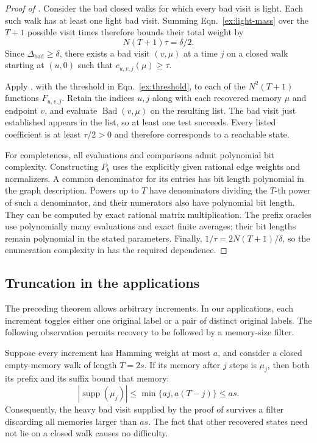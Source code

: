 \documentclass[letterpaper,11pt]{article}
\theoremstyle{definition}
\newcommand{\abs}[1]{\left|#1\right|}
\DeclareMathOperator{\supp}{supp}
\begin{document}
\begin{proof}[Proof of ]
Consider the bad closed walks for which every bad visit is light.
Each such walk has at least one light bad visit.  Summing
Eqn.~\eqref{ex:light-mass} over the $T+1$ possible visit times
therefore bounds their total weight by
\[
  N(T+1)\tau=\delta/2.
\]
Since $\Delta_{\mathrm{bad}}\geq\delta$, there exists a bad
visit $(v,\mu)$ at a time $j$ on a closed walk starting at $(u,0)$
such that $c_{u,v,j}(\mu)\geq\tau$.

Apply , with the threshold in
Eqn.~\eqref{ex:threshold}, to each of the $N^2(T+1)$ functions
$F_{u,v,j}$.  Retain the indices $u,j$ along with each recovered
memory $\mu$ and endpoint $v$, and evaluate
$\operatorname{Bad}(v,\mu)$ on the resulting list.  The bad visit
just established appears in the list, so at least one test succeeds.
Every listed coefficient is at least $\tau/2>0$ and therefore
corresponds to a reachable state.

For completeness, all evaluations and comparisons admit polynomial
bit complexity.  Constructing $P_b$ uses the explicitly given rational
edge weights and normalizers.  A common denominator for its entries
has bit length polynomial in the graph description.  Powers up to
$T$ have denominators dividing the $T$-th power of such a denominator,
and their numerators also have polynomial bit length.  They can be
computed by exact rational matrix multiplication.  The prefix oracles
use polynomially many evaluations and exact finite averages; their
bit lengths remain polynomial in the stated parameters.  Finally,
$1/\tau=2N(T+1)/\delta$, so the enumeration complexity in
 has the required dependence.
\end{proof}

\subsection{Truncation in the applications}

The preceding theorem allows arbitrary increments.  In our applications,
each increment toggles either one original label or a pair of distinct
original labels.  The following observation permits recovery to be
followed by a memory-size filter.

Suppose every increment has Hamming weight at most $a$, and consider a
closed empty-memory walk of length $T=2s$.  If its memory after $j$
steps is $\mu_j$, then both its prefix and its suffix bound that
memory:
\begin{equation}
  \abs{\supp(\mu_j)}
     \leq\min\{aj,a(T-j)\}
     \leq as.
  \label{ex:memory-filter}
\end{equation}
Consequently, the heavy bad visit supplied by the proof of
 survives a filter discarding all memories
larger than $as$.  The fact that other recovered states need not lie
on a closed walk causes no difficulty.
\end{document}
